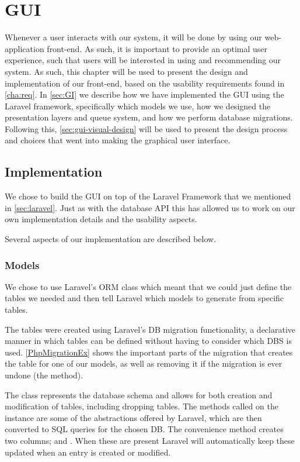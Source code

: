 \chapter{GUI} \label{GUI}
Whenever a user interacts with our system, it will be done by using our
web-application front-end. As such, it is important to provide an optimal user
experience, such that users will be interested in using and recommending our
system. As such, this chapter will be used to present the design and
implementation of our front-end, based on the usability requirements found in
\autoref{cha:req}. In \autoref{sec:GI} we describe how we have implemented the
GUI using the Laravel framework, specifically which models we use, how we
designed the presentation layers and queue system, and how we perform database
migrations. Following this, \autoref{sec:gui-visual-design} will be used to
present the design process and choices that went into making the graphical user
interface.


\section{Implementation}\label{sec:guiimplement}
We chose to build the \ac{GUI} on top of the Laravel Framework that we mentioned
in \autoref{sec:laravel}. Just as with the database \ac{API} this has allowed us
to work on our own implementation details and the usability aspects.\nl

Several aspects of our implementation are described below.

\subsection{Models}
We chose to use Laravel's \ac{ORM} class which meant that we could just define
the tables we needed and then tell Laravel which models to generate from
specific tables.\nl

The tables were created using Laravel's \ac{DB} migration functionality, a
declarative manner in which tables can be defined without having to consider
which \ac{DBS} is used. \autoref{PhpMigrationEx} shows the important parts of
the migration that creates the table for one of our models, as well as removing
it if the migration is ever undone (the  method).\nl

The  class represents the database schema and allows for both
creation and modification of tables, including dropping tables. The methods
called on the  instance  are some of the
abstractions offered by Laravel, which are then converted to \ac{SQL} queries for the chosen
\ac{DB}. The convenience method  creates two columns;
 and . When these are present Laravel will
automatically keep these updated when an entry is created or modified.\nl

